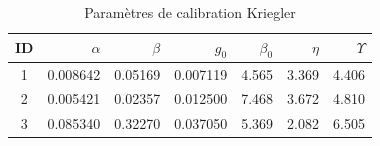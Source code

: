 \begin{table}[!h]
\centering
\caption{\label{tab:calibration_kriegler}Paramètres de calibration Kriegler}
\centering
\begin{tabular}[t]{crrrrrr}
\toprule
ID & $\alpha$ & $\beta$ & $g_0$ & $\beta_0$ & $\eta$ & $\Upsilon$\\
\midrule
1 & 0.008642 & 0.05169 & 0.007119 & 4.565 & 3.369 & 4.406\\
2 & 0.005421 & 0.02357 & 0.012500 & 7.468 & 3.672 & 4.810\\
3 & 0.085340 & 0.32270 & 0.037050 & 5.369 & 2.082 & 6.505\\
\bottomrule
\end{tabular}
\end{table}
